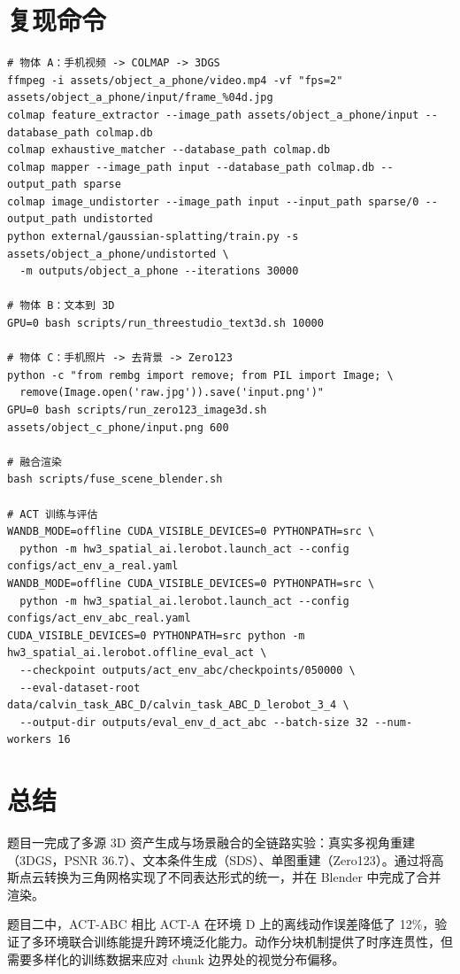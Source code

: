 \documentclass{article}
\begin{document}
\section{复现命令}

\begin{verbatim}
# 物体 A：手机视频 -> COLMAP -> 3DGS
ffmpeg -i assets/object_a_phone/video.mp4 -vf "fps=2" assets/object_a_phone/input/frame_%04d.jpg
colmap feature_extractor --image_path assets/object_a_phone/input --database_path colmap.db
colmap exhaustive_matcher --database_path colmap.db
colmap mapper --image_path input --database_path colmap.db --output_path sparse
colmap image_undistorter --image_path input --input_path sparse/0 --output_path undistorted
python external/gaussian-splatting/train.py -s assets/object_a_phone/undistorted \
  -m outputs/object_a_phone --iterations 30000

# 物体 B：文本到 3D
GPU=0 bash scripts/run_threestudio_text3d.sh 10000

# 物体 C：手机照片 -> 去背景 -> Zero123
python -c "from rembg import remove; from PIL import Image; \
  remove(Image.open('raw.jpg')).save('input.png')"
GPU=0 bash scripts/run_zero123_image3d.sh assets/object_c_phone/input.png 600

# 融合渲染
bash scripts/fuse_scene_blender.sh

# ACT 训练与评估
WANDB_MODE=offline CUDA_VISIBLE_DEVICES=0 PYTHONPATH=src \
  python -m hw3_spatial_ai.lerobot.launch_act --config configs/act_env_a_real.yaml
WANDB_MODE=offline CUDA_VISIBLE_DEVICES=0 PYTHONPATH=src \
  python -m hw3_spatial_ai.lerobot.launch_act --config configs/act_env_abc_real.yaml
CUDA_VISIBLE_DEVICES=0 PYTHONPATH=src python -m hw3_spatial_ai.lerobot.offline_eval_act \
  --checkpoint outputs/act_env_abc/checkpoints/050000 \
  --eval-dataset-root data/calvin_task_ABC_D/calvin_task_ABC_D_lerobot_3_4 \
  --output-dir outputs/eval_env_d_act_abc --batch-size 32 --num-workers 16
\end{verbatim}

\section{总结}

题目一完成了多源 3D 资产生成与场景融合的全链路实验：真实多视角重建（3DGS，PSNR 36.7）、文本条件生成（SDS）、单图重建（Zero123）。通过将高斯点云转换为三角网格实现了不同表达形式的统一，并在 Blender 中完成了合并渲染。

题目二中，ACT-ABC 相比 ACT-A 在环境 D 上的离线动作误差降低了 12\%，验证了多环境联合训练能提升跨环境泛化能力。动作分块机制提供了时序连贯性，但需要多样化的训练数据来应对 chunk 边界处的视觉分布偏移。
\end{document}
